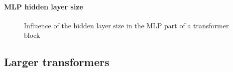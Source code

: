 \documentclass{article}
\theoremstyle{plain}%
\theoremstyle{definition}
\theoremstyle{remark}
\begin{document}
\paragraph{MLP hidden layer size}

\begin{figure}[H]
    \centering
    \caption{Influence of the hidden layer size in the MLP part of a transformer block}
    \label{fig:mlp_ratio_influence}
\end{figure}


\subsection{Larger transformers}
\end{document}
